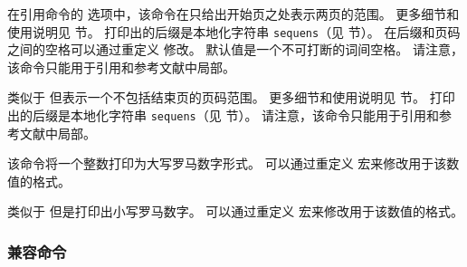 \begin{ltxsyntax}
在引用命令的  选项中，该命令在只给出开始页之处表示两页的范围。
更多细节和使用说明见  节。
打印出的后缀是本地化字符串 \texttt{sequens}（见  节）。
在后缀和页码之间的空格可以通过重定义  修改。
默认值是一个不可打断的词间空格。
请注意，该命令只能用于引用和参考文献中局部。



类似于  但表示一个不包括结束页的页码范围。
更多细节和使用说明见  节。
打印出的后缀是本地化字符串 \texttt{sequens}（见  节）。
请注意，该命令只能用于引用和参考文献中局部。



该命令将一个整数打印为大写罗马数字形式。
可以通过重定义  宏来修改用于该数值的格式。



类似于  但是打印出小写罗马数字。
可以通过重定义  宏来修改用于该数值的格式。

\end{ltxsyntax}

\subsubsection{ 兼容命令} %
\label{use:cit:nat}

